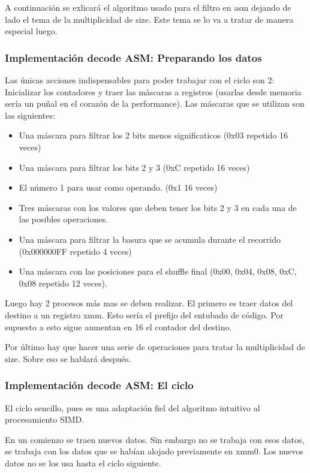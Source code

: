 	A continuación se exlicará el algoritmo usado para el filtro en asm dejando de lado
el tema de la multiplicidad de size. Este tema se lo va a tratar de manera especial luego.

\subsubsection{Implementación decode ASM: Preparando los datos}

	Las únicas acciones indispensables para poder trabajar con el ciclo son 2: Inicializar
los contadores y traer las máscaras a registros (usarlas desde memoria sería un puñal
en el corazón de la performance). Las máscaras que se utilizan son las siguientes:

\begin{itemize}
	\item Una máscara para filtrar los 2 bits menos significaticos (0x03 repetido 16 veces)
	\item Una máscara para filtrar los bits 2 y 3 (0xC repetido 16 veces)
	\item El número 1 para usar como operando. (0x1 16 veces)
	\item Tres máscaras con los valores que deben tener los bits 2 y 3 en cada una de las posibles operaciones.
	\item Una máscara para filtrar la basura que se acumula durante el recorrido (0x000000FF repetido 4 veces)
	\item Una máscara con las posiciones para el shuffle final (0x00, 0x04, 0x08, 0xC, 0x08 repetido 12 veces).
\end{itemize}

	Luego hay 2 procesos más mas se deben realizar. El primero es traer datos del destino
a un registro xmm. Esto sería el prefijo del entubado de código. Por supuesto
a esto sigue aumentan en 16 el contador del destino.

	Por último hay que hacer una serie de operaciones para tratar la multiplicidad
de size. Sobre eso se hablará después.


\subsubsection{Implementación decode ASM: El ciclo}


	El ciclo sencillo, pues es una adaptación fiel del algoritmo intuitivo
al procesamiento SIMD.
	
	En un comienzo se traen nuevos datos. Sin embargo no se trabaja con esos datos,
se trabaja con los datos que se habían alojado previamente en xmm0. Los nuevos datos
no se los usa hasta el ciclo siguiente.


